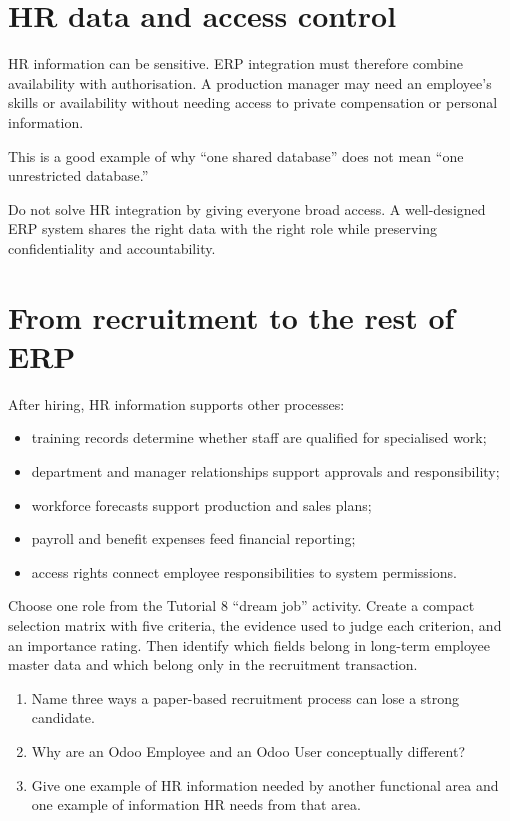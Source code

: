 \section{HR data and access control}

HR information can be sensitive. ERP integration must therefore combine availability with authorisation. A production manager may need an employee's skills or availability without needing access to private compensation or personal information.

This is a good example of why ``one shared database'' does not mean ``one unrestricted database.''

\begin{pitfall}
Do not solve HR integration by giving everyone broad access. A well-designed ERP system shares the right data with the right role while preserving confidentiality and accountability.
\end{pitfall}

\section{From recruitment to the rest of ERP}

After hiring, HR information supports other processes:

\begin{itemize}
  \item training records determine whether staff are qualified for specialised work;
  \item department and manager relationships support approvals and responsibility;
  \item workforce forecasts support production and sales plans;
  \item payroll and benefit expenses feed financial reporting;
  \item access rights connect employee responsibilities to system permissions.
\end{itemize}

\begin{tryit}
Choose one role from the Tutorial 8 ``dream job'' activity. Create a compact selection matrix with five criteria, the evidence used to judge each criterion, and an importance rating. Then identify which fields belong in long-term employee master data and which belong only in the recruitment transaction.
\end{tryit}

\begin{quickcheck}
\begin{enumerate}
  \item Name three ways a paper-based recruitment process can lose a strong candidate.
  \item Why are an Odoo Employee and an Odoo User conceptually different?
  \item Give one example of HR information needed by another functional area and one example of information HR needs from that area.
\end{enumerate}
\end{quickcheck}

